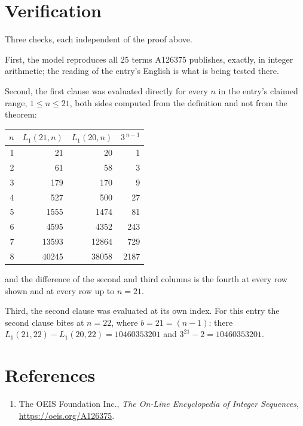 \documentclass[11pt,a4paper]{article}
\theoremstyle{plain}
\theoremstyle{definition}
\begin{document}
\section{Verification}

Three checks, each independent of the proof above.

First, the model reproduces all $25$ terms A126375 publishes, exactly, in integer
arithmetic; the reading of the entry's English is what is being tested there.

Second, the first clause was evaluated directly for every $n$ in the entry's claimed range,
$1\le n\le21$, both sides computed from the definition and not from the theorem:

\begin{center}
\begin{tabular}{rrrr}
$n$ & $L_{1}(21,n)$ & $L_{1}(20,n)$ & $3^{\,n-1}$ \\ \hline
1 & 21 & 20 & 1 \\
2 & 61 & 58 & 3 \\
3 & 179 & 170 & 9 \\
4 & 527 & 500 & 27 \\
5 & 1555 & 1474 & 81 \\
6 & 4595 & 4352 & 243 \\
7 & 13593 & 12864 & 729 \\
8 & 40245 & 38058 & 2187 \\
\end{tabular}
\end{center}

\noindent and the difference of the second and third columns is the fourth at every row shown
and at every row up to $n=21$.

Third, the second clause was evaluated at its own index. For this entry the second clause bites at $n=22$, where $b=21=(n-1)$: there $L_{1}(21,22)-L_{1}(20,22)=10460353201$ and $3^{21}-2=10460353201$.

\section*{References}
\begin{enumerate}
\item The OEIS Foundation Inc., \emph{The On-Line Encyclopedia of Integer Sequences},
\url{https://oeis.org/A126375}.
\end{enumerate}
\end{document}
